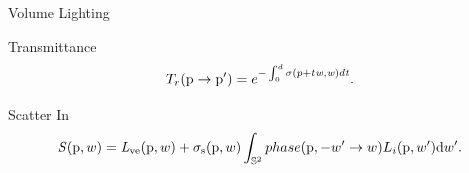 \documentclass[10pt,handout,compress,professionalfont]{beamer}
\begin{document}
\begin{frame}{Volume Lighting}

    \begin{block}{Transmittance}
        \[
            T_{r}(\textup{p} \to \textup{p}') = e^{-\int_{0}^{d}\sigma (p+t\mathit{w},\mathit{w})d\mathit{t}}.
        \]
    \end{block}

    \begin{block}{Scatter In}
        \[
            \mathit{S}(\textup{p},w) = \mathit{L}_{\textup{ve}}(\textup{p},w) + \sigma_{\textup{s}}(\textup{p}, w) \int_{\mathbb{S}^2} phase(\textup{p}, -w' \to w) L_{i}(\textup{p},w')\textup{d}w'.
        \]
    \end{block}

\end{frame}
\end{document}
